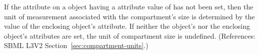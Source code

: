 If the attribute  on a \Compartment object having a
 attribute value of  has not been set, then
the unit of measurement associated with the compartment's size is
determined by the value of the enclosing \Model object's 
attribute.  If neither the \Compartment object's  nor the
enclosing \Model object's  attributes are set, the unit of
compartment size is undefined.  (References: SBML L3V2
Section~\ref{sec:compartment-units}.)
